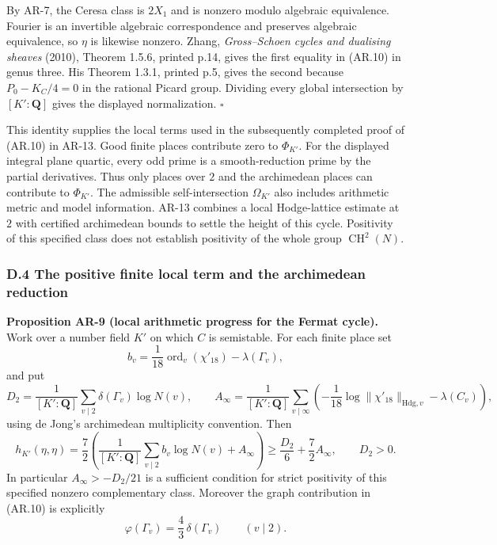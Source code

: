 \documentclass[11pt,a4paper]{article}
\begin{document}
By AR-7, the Ceresa class is \(2X_1\) and is nonzero modulo algebraic
equivalence. Fourier is an invertible algebraic correspondence and
preserves algebraic equivalence, so \(\eta\) is likewise nonzero. Zhang,
\emph{Gross--Schoen cycles and dualising sheaves} (2010), Theorem 1.5.6,
printed p.14, gives the first equality in (AR.10) in genus three. His
Theorem 1.3.1, printed p.5, gives the second because \(P_0-K_C/4=0\) in
the rational Picard group. Dividing every global intersection by
\([K':\mathbf Q]\) gives the displayed normalization. \(\square\)

This identity supplies the local terms used in the subsequently
completed proof of (AR.10) in AR-13. Good finite places contribute zero
to \(\Phi_{K'}\). For the displayed integral plane quartic, every odd
prime is a smooth-reduction prime by the partial derivatives. Thus only
places over \(2\) and the archimedean places can contribute to
\(\Phi_{K'}\). The admissible self-intersection \(\Omega_{K'}\) also
includes arithmetic metric and model information. AR-13 combines a local
Hodge-lattice estimate at \(2\) with certified archimedean bounds to
settle the height of this cycle. Positivity of this specified class does
not establish positivity of the whole group \(\operatorname{CH}^2(N)\).

\subsubsection{D.4 The positive finite local term and the archimedean
reduction}\label{d.4-the-positive-finite-local-term-and-the-archimedean-reduction}

\textbf{Proposition AR-9 (local arithmetic progress for the Fermat
cycle).} Work over a number field \(K'\) on which \(C\) is semistable.
For each finite place set \[
b_v=\frac1{18}\operatorname{ord}_v(\chi'_{18})-\lambda(\Gamma_v),
\] and put \[
D_2=\frac1{[K':\mathbf Q]}\sum_{v\mid2}\delta(\Gamma_v)\log N(v),\qquad
A_\infty=\frac1{[K':\mathbf Q]}\sum_{v\mid\infty}
\left(-\frac1{18}\log\|\chi'_{18}\|_{\mathrm{Hdg},v}-\lambda(C_v)\right),
\] using de Jong's archimedean multiplicity convention. Then \[
h_{K'}(\eta,\eta)
 =\frac72\left(
  \frac1{[K':\mathbf Q]}\sum_{v\mid2}b_v\log N(v)+A_\infty
 \right)
 \ge\frac{D_2}{6}+\frac72 A_\infty,\qquad D_2>0.
\tag{AR.12}
\] In particular \(A_\infty>-D_2/21\) is a sufficient condition for
strict positivity of this specified nonzero complementary class.
Moreover the graph contribution in (AR.10) is explicitly \[
\varphi(\Gamma_v)=\frac43\,\delta(\Gamma_v)\qquad(v\mid2).
\tag{AR.13}
\]
\end{document}
